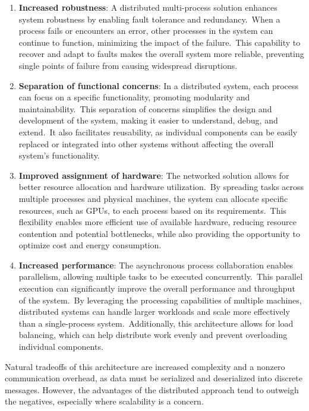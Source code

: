 \begin{enumerate}
    \item \textbf{Increased robustness}: A distributed multi-process solution enhances system robustness by enabling fault tolerance and redundancy.\ When a process fails or encounters an error, other processes in the system can continue to function, minimizing the impact of the failure.\ This capability to recover and adapt to faults makes the overall system more reliable, preventing single points of failure from causing widespread disruptions.
    \item \textbf{Separation of functional concerns}: In a distributed system, each process can focus on a specific functionality, promoting modularity and maintainability.\ This separation of concerns simplifies the design and development of the system, making it easier to understand, debug, and extend.\ It also facilitates reusability, as individual components can be easily replaced or integrated into other systems without affecting the overall system's functionality.
    \item \textbf{Improved assignment of hardware}: The networked solution allows for better resource allocation and hardware utilization.\ By spreading tasks across multiple processes and physical machines, the system can allocate specific resources, such as GPUs, to each process based on its requirements.\ This flexibility enables more efficient use of available hardware, reducing resource contention and potential bottlenecks, while also providing the opportunity to optimize cost and energy consumption.
    \item \textbf{Increased performance}: The asynchronous process collaboration enables parallelism, allowing multiple tasks to be executed concurrently.\ This parallel execution can significantly improve the overall performance and throughput of the system.\ By leveraging the processing capabilities of multiple machines, distributed systems can handle larger workloads and scale more effectively than a single-process system.\ Additionally, this architecture allows for load balancing, which can help distribute work evenly and prevent overloading individual components.
\end{enumerate}

Natural tradeoffs of this architecture are increased complexity and a nonzero communication overhead, as data must be serialized and deserialized into discrete messages.
However, the advantages of the distributed approach tend to outweigh the negatives, especially where scalability is a concern.

